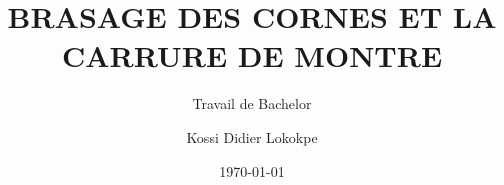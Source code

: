 \author{Kossi Didier Lokokpe}

\setfemale

\title{BRASAGE DES CORNES ET LA CARRURE DE MONTRE}

\subtitle{Travail de Bachelor}


\date{\today}

